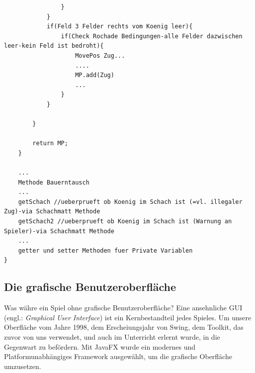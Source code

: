 \documentclass[12pt,a4paper]{article}
\begin{document}
{\begin{lstlisting}
				}
			}
			if(Feld 3 Felder rechts vom Koenig leer){
				if(Check Rochade Bedingungen-alle Felder dazwischen leer-kein Feld ist bedroht){
					MovePos Zug...
					....
					MP.add(Zug)
					...
				}
			}
		
		}
		
		return MP;
	}
	
	...
	Methode Bauerntausch
	...
	getSchach //ueberprueft ob Koenig im Schach ist (=vl. illegaler Zug)-via Schachmatt Methode
	getSchach2 //ueberprueft ob Koenig im Schach ist (Warnung an Spieler)-via Schachmatt Methode
	...
	getter und setter Methoden fuer Private Variablen
}
\end{lstlisting}

\newpage
\subsection{Die grafische Benutzeroberfläche}
Was währe ein Spiel ohne grafische Benutzeroberfläche? Eine ansehnliche GUI (engl.: \textit{Graphical User Interface}) ist ein Kernbestandteil jedes Spieles. Um unsere Oberfläche vom Jahre 1998, dem Erscheiungsjahr von Swing, dem Toolkit, das zuvor von uns verwendet, und auch im Unterricht erlernt wurde, in die Gegenwart zu befördern. Mit JavaFX wurde ein modernes und Platformunabhängiges Framework ausgewählt, um die grafische Oberfläche umzusetzen.

}
\end{document}
